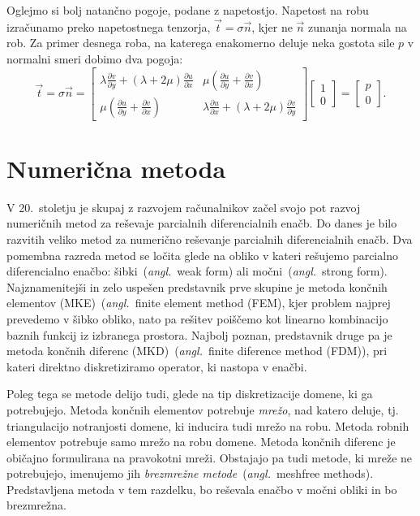\documentclass[12pt,a4paper]{article}
\theoremstyle{definition} %
\theoremstyle{plain} %
\numberwithin{equation}{section}
\newcommand{\dpar}[2]{\ensuremath{\frac{\partial #1}{\partial #2}}}
\newcommand{\vt}{\vec{t}}
\newcommand{\vn}{\vec{n}}
\newcommand{\ts}{\sigma}
\newcommand{\ang}[1]{(\textit{angl.}\ #1)}
\begin{document}
Oglejmo si bolj natančno pogoje, podane z napetostjo. Napetost na robu
izračunamo preko napetostnega tenzorja, $\vt = \ts\vn$, kjer ne $\vn$ zunanja
normala na rob. Za primer desnega roba, na katerega enakomerno deluje neka gostota
sile $p$ v normalni smeri dobimo dva pogoja:
\[
   \vt = \ts\vn =
  \begin{bmatrix}
    \lambda \dpar{v}{y} + (\lambda+2\mu) \dpar{u}{x} &
    \mu(\dpar{u}{y} + \dpar{v}{x}) \\
    \mu(\dpar{u}{y} + \dpar{v}{x}) &
    \lambda \dpar{u}{x} + (\lambda+2\mu) \dpar{v}{y}
  \end{bmatrix}
  \begin{bmatrix}
    1 \\ 0
  \end{bmatrix}
  =
  \begin{bmatrix}
    p \\ 0
  \end{bmatrix}.
\]

\section{Numerična metoda}
\label{sec:numericna-metoda}

V 20.~stoletju je skupaj z razvojem računalnikov začel svojo pot razvoj numeričnih
metod za reševaje parcialnih diferencialnih enačb. Do danes je bilo razvitih
veliko metod za numerično reševanje parcialnih diferencialnih enačb. Dva
pomembna razreda metod se ločita glede na obliko v kateri rešujemo parcialno
diferencialno enačbo: šibki~\ang{weak form} ali močni~\ang{strong form}.
Najznamenitejši in zelo uspešen predstavnik prve skupine je metoda končnih
elementov (MKE)~\ang{finite element method (FEM}, kjer problem najprej prevedemo
v šibko obliko, nato pa rešitev poiščemo kot linearno kombinacijo baznih
funkcij iz izbranega prostora. Najbolj poznan, predstavnik druge pa je metoda
končnih diferenc (MKD)~\ang{finite diference method (FDM)}, pri kateri
direktno diskretiziramo operator, ki nastopa v enačbi.

Poleg tega se metode delijo tudi, glede na tip diskretizacije domene, ki ga
potrebujejo. Metoda končnih elementov potrebuje \emph{mrežo}, nad katero deluje,
tj. triangulacijo notranjosti domene, ki inducira tudi mrežo na robu.
Metoda robnih elementov potrebuje samo mrežo na robu domene. Metoda končnih
diferenc je običajno formulirana na pravokotni mreži. Obstajajo pa tudi
metode, ki mreže ne potrebujejo, imenujemo jih \emph{brezmrežne
metode}~\ang{meshfree methods}. Predstavljena metoda v tem razdelku, bo reševala
enačbo v močni obliki in bo brezmrežna.
\end{document}
